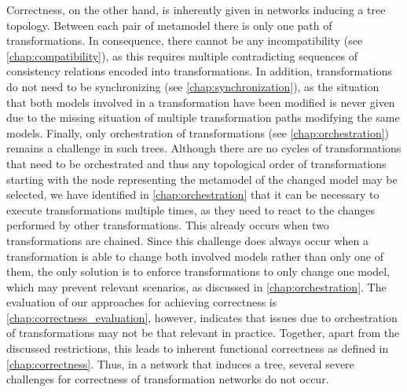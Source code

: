Correctness, on the other hand, is inherently given in networks inducing a tree topology.
Between each pair of metamodel there is only one path of transformations.
In consequence, there cannot be any incompatibility (see \autoref{chap:compatibility}), as this requires multiple contradicting sequences of consistency relations encoded into transformations.
In addition, transformations do not need to be synchronizing (see \autoref{chap:synchronization}), as the situation that both models involved in a transformation have been modified is never given due to the missing situation of multiple transformation paths modifying the same models.
Finally, only orchestration of transformations (see \autoref{chap:orchestration}) remains a challenge in such trees.
Although there are no cycles of transformations that need to be orchestrated and thus any topological order of transformations starting with the node representing the metamodel of the changed model may be selected, we have identified in \autoref{chap:orchestration} that it can be necessary to execute transformations multiple times, as they need to react to the changes performed by other transformations.
This already occurs when two transformations are chained.
Since this challenge does always occur when a transformation is able to change both involved models rather than only one of them, the only solution is to enforce transformations to only change one model, which may prevent relevant scenarios, as discussed in \autoref{chap:orchestration}.
The evaluation of our approaches for achieving correctness is \autoref{chap:correctness_evaluation}, however, indicates that issues due to orchestration of transformations may not be that relevant in practice.
Together, apart from the discussed restrictions, this leads to inherent functional correctness as defined in \autoref{chap:correctness}.
Thus, in a network that induces a tree, several severe challenges for correctness of transformation networks do not occur.


